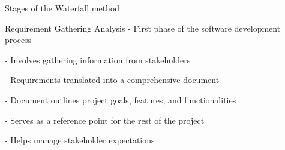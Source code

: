 \begin{frame}{Stages of the Waterfall method}
    \begin{block}{Requirement Gathering Analysis}
        - First phase of the software development process
        
        - Involves gathering information from stakeholders
        
        - Requirements translated into a comprehensive document

        - Document outlines project goals, features, and functionalities

        - Serves as a reference point for the rest of the project

        - Helps manage stakeholder expectations
    \end{block}   
\end{frame}
